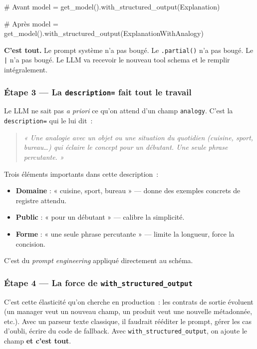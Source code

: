 \documentclass[11pt,a4paper]{article}
\begin{document}
\begin{pythoncode}
# Avant
model = get_model().with_structured_output(Explanation)

# Après
model = get_model().with_structured_output(ExplanationWithAnalogy)
\end{pythoncode}

\textbf{C'est tout.} Le prompt système n'a pas bougé. Le \texttt{.partial()}
n'a pas bougé. Le \texttt{|} n'a pas bougé. Le LLM va recevoir le nouveau
tool schema et le remplir intégralement.

\subsubsection*{Étape 3 — La \texttt{description=} fait tout le travail}

Le LLM ne sait pas \emph{a priori} ce qu'on attend d'un champ
\texttt{analogy}. C'est la \texttt{description=} qui le lui dit~:

\begin{quote}\itshape
\textit{« Une analogie avec un objet ou une situation du quotidien
(cuisine, sport, bureau\dots) qui éclaire le concept pour un débutant.
Une seule phrase percutante. »}
\end{quote}

Trois éléments importants dans cette description~:
\begin{itemize}[leftmargin=*]
  \item \textbf{Domaine} : « cuisine, sport, bureau » — donne des exemples
        concrets de registre attendu.
  \item \textbf{Public} : « pour un débutant » — calibre la simplicité.
  \item \textbf{Forme} : « une seule phrase percutante » — limite la
        longueur, force la concision.
\end{itemize}

C'est du \emph{prompt engineering} appliqué directement au schéma.

\subsubsection*{Étape 4 — La force de \texttt{with\_structured\_output}}

C'est cette élasticité qu'on cherche en production~: les contrats de
sortie évoluent (un manager veut un nouveau champ, un produit veut une
nouvelle métadonnée, etc.). Avec un parseur texte classique, il faudrait
rééditer le prompt, gérer les cas d'oubli, écrire du code de fallback.
Avec \texttt{with\_structured\_output}, on ajoute le champ \textbf{et c'est
tout}.
\end{document}
